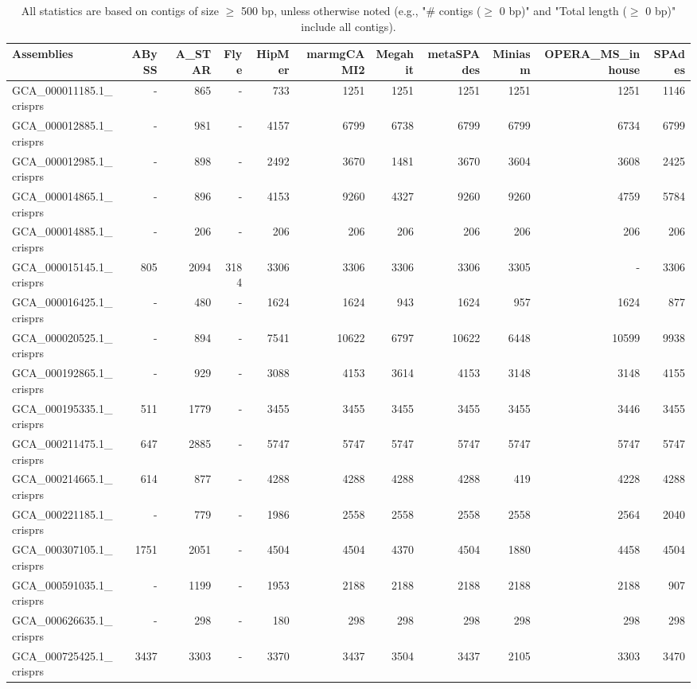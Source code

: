 \documentclass[12pt,a4paper]{article}
\begin{document}
\begin{table}[ht]
\begin{center}
\caption{All statistics are based on contigs of size $\geq$ 500 bp, unless otherwise noted (e.g., "\# contigs ($\geq$ 0 bp)" and "Total length ($\geq$ 0 bp)" include all contigs).}
\begin{tabular}{|l*{10}{|r}|}
\hline
Assemblies & ABySS & A\_STAR & Flye & HipMer & marmgCAMI2 & Megahit & metaSPAdes & Miniasm & OPERA\_MS\_inhouse & SPAdes \\ \hline
GCA\_000011185.1\_crisprs & - & 865 & - & 733 & 1251 & 1251 & 1251 & 1251 & 1251 & 1146 \\ \hline
GCA\_000012885.1\_crisprs & - & 981 & - & 4157 & 6799 & 6738 & 6799 & 6799 & 6734 & 6799 \\ \hline
GCA\_000012985.1\_crisprs & - & 898 & - & 2492 & 3670 & 1481 & 3670 & 3604 & 3608 & 2425 \\ \hline
GCA\_000014865.1\_crisprs & - & 896 & - & 4153 & 9260 & 4327 & 9260 & 9260 & 4759 & 5784 \\ \hline
GCA\_000014885.1\_crisprs & - & 206 & - & 206 & 206 & 206 & 206 & 206 & 206 & 206 \\ \hline
GCA\_000015145.1\_crisprs & 805 & 2094 & 3184 & 3306 & 3306 & 3306 & 3306 & 3305 & - & 3306 \\ \hline
GCA\_000016425.1\_crisprs & - & 480 & - & 1624 & 1624 & 943 & 1624 & 957 & 1624 & 877 \\ \hline
GCA\_000020525.1\_crisprs & - & 894 & - & 7541 & 10622 & 6797 & 10622 & 6448 & 10599 & 9938 \\ \hline
GCA\_000192865.1\_crisprs & - & 929 & - & 3088 & 4153 & 3614 & 4153 & 3148 & 3148 & 4155 \\ \hline
GCA\_000195335.1\_crisprs & 511 & 1779 & - & 3455 & 3455 & 3455 & 3455 & 3455 & 3446 & 3455 \\ \hline
GCA\_000211475.1\_crisprs & 647 & 2885 & - & 5747 & 5747 & 5747 & 5747 & 5747 & 5747 & 5747 \\ \hline
GCA\_000214665.1\_crisprs & 614 & 877 & - & 4288 & 4288 & 4288 & 4288 & 419 & 4228 & 4288 \\ \hline
GCA\_000221185.1\_crisprs & - & 779 & - & 1986 & 2558 & 2558 & 2558 & 2558 & 2564 & 2040 \\ \hline
GCA\_000307105.1\_crisprs & 1751 & 2051 & - & 4504 & 4504 & 4370 & 4504 & 1880 & 4458 & 4504 \\ \hline
GCA\_000591035.1\_crisprs & - & 1199 & - & 1953 & 2188 & 2188 & 2188 & 2188 & 2188 & 907 \\ \hline
GCA\_000626635.1\_crisprs & - & 298 & - & 180 & 298 & 298 & 298 & 298 & 298 & 298 \\ \hline
GCA\_000725425.1\_crisprs & 3437 & 3303 & - & 3370 & 3437 & 3504 & 3437 & 2105 & 3303 & 3470 \\ \hline
\end{tabular}
\end{center}
\end{table}
\end{document}
